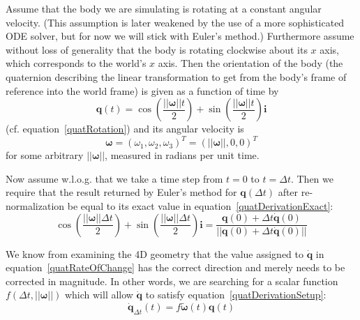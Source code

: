 Assume that the body we are simulating is rotating at a constant angular velocity.
(This assumption is later weakened by the use of a more sophisticated ODE solver,
but for now we will stick with Euler's method.) Furthermore assume without loss of
generality that the body is rotating clockwise about its $x$ axis, which corresponds
to the world's $x$ axis. Then the orientation of the body (the quaternion describing
the linear transformation to get from the body's frame of reference into the world
frame) is given as a function of time by
\begin{equation}
\label{quatDerivationExact}
\mathbf{q}(t) = \cos\left(\frac{||\bm{\omega}||t}{2}\right) +
    \sin\left(\frac{||\bm{\omega}||t}{2}\right)\mathbf{i}
\end{equation}
(cf. equation~\ref{quatRotation}) and its angular velocity is
\begin{equation}
\bm{\omega} = (\omega_1, \omega_2, \omega_3)^T = (||\bm{\omega}||, 0, 0)^T
\end{equation}
for some arbitrary $||\bm{\omega}||$, measured in radians per unit time.

Now assume w.l.o.g. that we take a time step from $t = 0$ to $t = \Delta t$.
Then we require that the result returned by Euler's method for $\mathbf{q}(\Delta t)$
after re-normalization be equal to its exact value in equation~\ref{quatDerivationExact}:
\begin{equation}
\label{quatDerivationSetup}
\cos\left(\frac{||\bm{\omega}||\Delta t}{2}\right) +
    \sin\left(\frac{||\bm{\omega}||\Delta t}{2}\right)\mathbf{i} =
    \frac{\mathbf{q}(0) + \Delta t \dot{\mathbf{q}}(0)}
        {||\mathbf{q}(0) + \Delta t \dot{\mathbf{q}}(0)||}
\end{equation}

We know from examining the 4D geometry that the value assigned to $\dot{\mathbf{q}}$
in equation~\ref{quatRateOfChange} has the correct direction and merely needs to be
corrected in magnitude. In other words, we are searching for a scalar function
$f(\Delta t, ||\bm{\omega}||)$ which will allow $\dot{\mathbf{q}}$ to satisfy
equation~\ref{quatDerivationSetup}:
\begin{equation}
\dot{\mathbf{q}}_{\Delta t}(t) = f\tilde{\bm{\omega}}(t)\mathbf{q}(t)
\end{equation}

